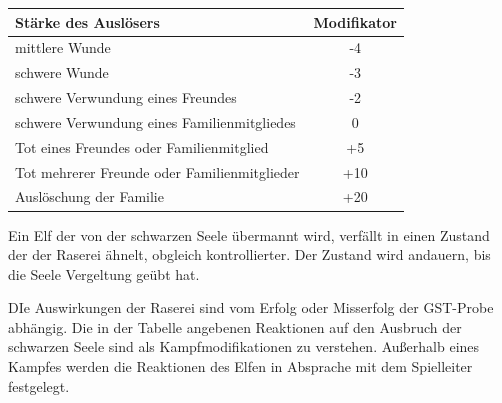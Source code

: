 \begin{center}
\begin{tabular}{l|c}
Stärke des Auslösers & Modifikator\\
\hline

mittlere Wunde & -4\\
schwere Wunde & -3\\
schwere Verwundung eines Freundes & -2\\
schwere Verwundung eines Familienmitgliedes & 0\\
Tot eines Freundes oder Familienmitglied & +5\\
Tot mehrerer Freunde oder Familienmitglieder & +10\\
Auslöschung der Familie & +20\\

\end{tabular}
\end{center}

\par Ein Elf der von der schwarzen Seele übermannt wird, verfällt in
einen Zustand der der Raserei ähnelt, obgleich kontrollierter. Der
Zustand wird andauern, bis die Seele Vergeltung geübt hat.
\par DIe Auswirkungen der Raserei sind vom Erfolg oder Misserfolg
der GST-Probe abhängig. Die in der Tabelle angebenen Reaktionen auf
den Ausbruch der schwarzen Seele sind als Kampfmodifikationen zu
verstehen. Außerhalb eines Kampfes werden die Reaktionen des Elfen
in Absprache mit dem Spielleiter festgelegt.

